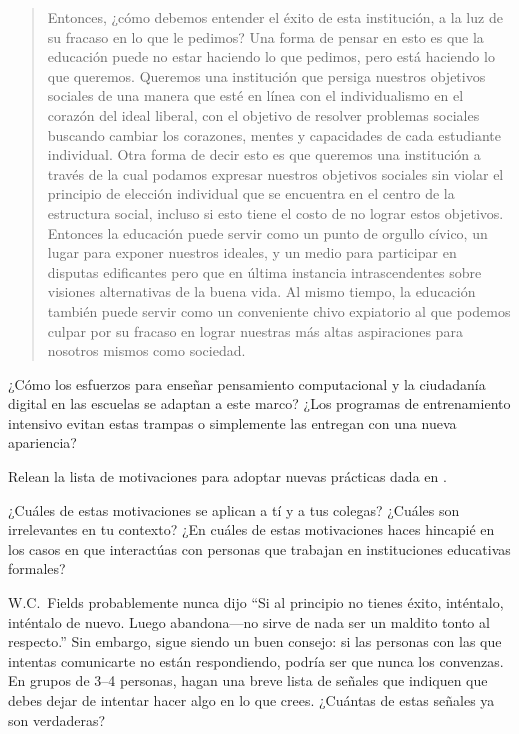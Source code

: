 \begin{quote}

Entonces, ¿cómo debemos entender el éxito de esta institución,
a la luz de su fracaso en lo que le pedimos?
Una forma de pensar en esto es que
la educación puede no estar haciendo lo que pedimos,
pero está haciendo lo que queremos.
Queremos una institución que persiga nuestros objetivos sociales
de una manera que esté en línea con el individualismo en el corazón del ideal liberal,
con el objetivo de resolver problemas sociales
buscando cambiar los corazones, mentes y capacidades de cada estudiante individual.
Otra forma de decir esto es que
queremos una institución a través de la cual podamos expresar nuestros objetivos sociales
sin violar el principio de elección individual
que se encuentra en el centro de la estructura social,
incluso si esto tiene el costo de no lograr estos objetivos.
Entonces la educación puede servir como un punto de orgullo cívico,
un lugar para exponer nuestros ideales,
y un medio para participar en disputas edificantes pero  
que en última instancia intrascendentes
sobre visiones alternativas de la buena vida.
Al mismo tiempo,
la educación también puede servir como un conveniente chivo expiatorio
al que podemos culpar por su fracaso en lograr nuestras más altas aspiraciones para nosotros mismos como sociedad.

\end{quote}

¿Cómo los esfuerzos para enseñar pensamiento computacional y la ciudadanía digital en las escuelas se adaptan a este marco?
¿Los programas de entrenamiento intensivo evitan estas trampas o simplemente las entregan con una nueva apariencia?


Relean la lista de motivaciones para adoptar nuevas prácticas
dada en .

¿Cuáles de estas motivaciones se aplican a tí y a tus colegas?
¿Cuáles son irrelevantes en tu contexto?
¿En cuáles de estas motivaciones haces hincapié
en los casos en que interactúas con personas que trabajan en instituciones educativas formales?



W.C.~Fields probablemente nunca dijo
``Si al principio no tienes éxito, inténtalo, inténtalo de nuevo.
Luego abandona---no sirve de nada ser un maldito tonto al respecto.''
Sin embargo, sigue siendo un buen consejo:
si las personas con las que intentas comunicarte no están respondiendo,
podría ser que nunca los convenzas.
En grupos de 3--4 personas,
hagan una breve lista de señales que indiquen que debes dejar de intentar hacer algo en lo que crees.
¿Cuántas de estas señales ya son verdaderas?



